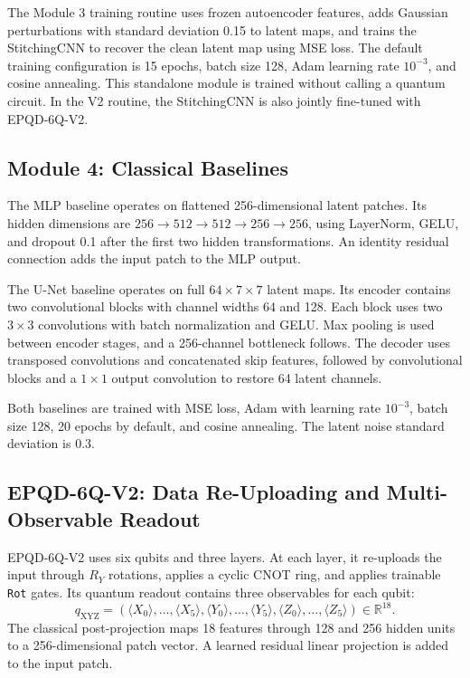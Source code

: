 The Module 3 training routine uses frozen autoencoder features, adds Gaussian perturbations with standard deviation 0.15 to latent maps, and trains the StitchingCNN to recover the clean latent map using MSE loss. The default training configuration is 15 epochs, batch size 128, Adam learning rate $10^{-3}$, and cosine annealing. This standalone module is trained without calling a quantum circuit. In the V2 routine, the StitchingCNN is also jointly fine-tuned with EPQD-6Q-V2.

\subsection{Module 4: Classical Baselines}
The MLP baseline operates on flattened 256-dimensional latent patches. Its hidden dimensions are $256\rightarrow512\rightarrow512\rightarrow256\rightarrow256$, using LayerNorm, GELU, and dropout 0.1 after the first two hidden transformations. An identity residual connection adds the input patch to the MLP output.

The U-Net baseline operates on full $64\times7\times7$ latent maps. Its encoder contains two convolutional blocks with channel widths 64 and 128. Each block uses two $3\times3$ convolutions with batch normalization and GELU. Max pooling is used between encoder stages, and a 256-channel bottleneck follows. The decoder uses transposed convolutions and concatenated skip features, followed by convolutional blocks and a $1\times1$ output convolution to restore 64 latent channels.

Both baselines are trained with MSE loss, Adam with learning rate $10^{-3}$, batch size 128, 20 epochs by default, and cosine annealing. The latent noise standard deviation is 0.3.

\subsection{EPQD-6Q-V2: Data Re-Uploading and Multi-Observable Readout}
EPQD-6Q-V2 uses six qubits and three layers. At each layer, it re-uploads the input through $R_Y$ rotations, applies a cyclic CNOT ring, and applies trainable \texttt{Rot} gates. Its quantum readout contains three observables for each qubit:
\begin{equation}
    q_{\mathrm{XYZ}}=
    (\langle X_0\rangle,\ldots,\langle X_5\rangle,
     \langle Y_0\rangle,\ldots,\langle Y_5\rangle,
     \langle Z_0\rangle,\ldots,\langle Z_5\rangle)
    \in\mathbb{R}^{18}.
\end{equation}
The classical post-projection maps 18 features through 128 and 256 hidden units to a 256-dimensional patch vector. A learned residual linear projection is added to the input patch.

